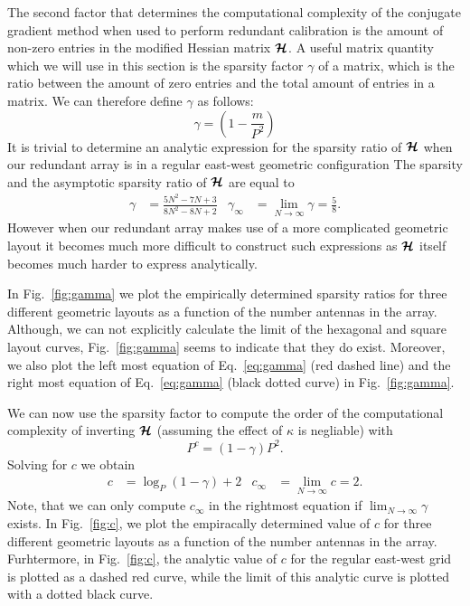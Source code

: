 \documentclass[useAMS,usenatbib]{mn2e}
\newcommand{\bH}{\bmath{H}}
\newcommand{\bmH}{\bmath{\mathcal{H}}}
\begin{document}
The second factor that determines the computational complexity of the conjugate gradient method when used to perform redundant calibration is the amount of non-zero
entries in the modified Hessian matrix $\bmH$. 
A useful matrix quantity which we will use in this section is the sparsity factor $\gamma$ of a matrix, which is the ratio between the amount of zero entries and the total amount of entries in a matrix. We 
can therefore define $\gamma$ as follows:
\begin{equation}
 \gamma = \left (1 - \frac{m}{P^2} \right ) 
\end{equation}
It is trivial to determine an analytic expression for the sparsity ratio of $\bmH$ when our redundant array is in a regular east-west geometric configuration
The sparsity and the asymptotic sparsity ratio of $\bmH$ are equal to
\begin{align}
\gamma &= \frac{5N^2-7N+3}{8N^2-8N+2} & \gamma_{\infty} &= \lim_{N\rightarrow \infty}\gamma = \frac{5}{8} \label{eq:gamma}. 
\end{align}
However when our redundant array makes use of a more complicated geometric layout it becomes much more difficult to construct such expressions as $\bmH$ itself 
becomes much harder to express analytically. 

In Fig.~\ref{fig:gamma} we plot the empirically determined sparsity ratios for three different geometric layouts as a function of the number antennas in the array. Although, we can not explicitly calculate 
the limit of the hexagonal and square layout curves, Fig.~\ref{fig:gamma} seems to indicate that they do exist. Moreover, we also plot the left most equation
of Eq.~\eqref{eq:gamma} (red dashed line) and the right most equation of Eq.~\eqref{eq:gamma} (black dotted curve) in Fig.~\ref{fig:gamma}.  

We can now use the sparsity factor to compute the order of the computational complexity of inverting $\bmH$ (assuming the effect of $\kappa$ is negliable) with
\begin{equation}
P^{c} = (1 - \gamma)P^2.
\end{equation}
Solving for $c$ we obtain
\begin{align}
c &= \log_{P}(1 - \gamma) + 2 & c_{\infty} &= \lim_{N\rightarrow \infty} c = 2. \label{eq:c}
\end{align}
Note, that we can only compute $c_{\infty}$ in the rightmost equation if $\lim_{N\rightarrow \infty} \gamma$ exists. 
In Fig.~\ref{fig:c}, we plot the empiracally determined value of $c$ for three different geometric layouts as a function of the number antennas in the array.
Furhtermore, in Fig.~\ref{fig:c}, the analytic value of $c$ for the regular east-west grid is plotted as a dashed red curve, while the limit of this analytic curve is plotted with a dotted black curve. 
\end{document}
